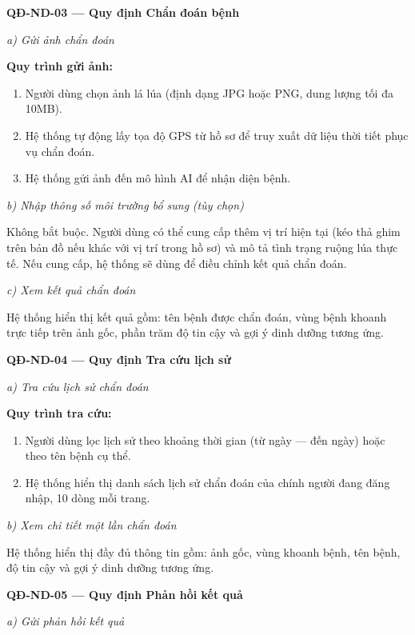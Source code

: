 ﻿\documentclass[12pt,a4paper]{article}
\begin{document}
\vspace{0.3cm}
\noindent\textbf{QĐ-ND-03 --- Quy định Chẩn đoán bệnh}

\noindent\textit{a) Gửi ảnh chẩn đoán}

\noindent\textbf{Quy trình gửi ảnh:}
\begin{enumerate}
    \item Người dùng chọn ảnh lá lúa (định dạng JPG hoặc PNG, dung lượng tối đa 10MB).
    \item Hệ thống tự động lấy tọa độ GPS từ hồ sơ để truy xuất dữ liệu thời tiết phục vụ chẩn đoán.
    \item Hệ thống gửi ảnh đến mô hình AI để nhận diện bệnh.
\end{enumerate}

\noindent\textit{b) Nhập thông số môi trường bổ sung} \textit{(tùy chọn)}

Không bắt buộc. Người dùng có thể cung cấp thêm vị trí hiện tại (kéo thả ghim trên bản đồ nếu khác với vị trí trong hồ sơ) và mô tả tình trạng ruộng lúa thực tế. Nếu cung cấp, hệ thống sẽ dùng để điều chỉnh kết quả chẩn đoán.

\noindent\textit{c) Xem kết quả chẩn đoán}

Hệ thống hiển thị kết quả gồm: tên bệnh được chẩn đoán, vùng bệnh khoanh trực tiếp trên ảnh gốc, phần trăm độ tin cậy và gợi ý dinh dưỡng tương ứng.

\vspace{0.3cm}
\noindent\textbf{QĐ-ND-04 --- Quy định Tra cứu lịch sử}

\noindent\textit{a) Tra cứu lịch sử chẩn đoán}

\noindent\textbf{Quy trình tra cứu:}
\begin{enumerate}
    \item Người dùng lọc lịch sử theo khoảng thời gian (từ ngày --- đến ngày) hoặc theo tên bệnh cụ thể.
    \item Hệ thống hiển thị danh sách lịch sử chẩn đoán của chính người đang đăng nhập, 10 dòng mỗi trang.
\end{enumerate}

\noindent\textit{b) Xem chi tiết một lần chẩn đoán}

Hệ thống hiển thị đầy đủ thông tin gồm: ảnh gốc, vùng khoanh bệnh, tên bệnh, độ tin cậy và gợi ý dinh dưỡng tương ứng.

\vspace{0.3cm}
\noindent\textbf{QĐ-ND-05 --- Quy định Phản hồi kết quả}

\noindent\textit{a) Gửi phản hồi kết quả}
\end{document}
